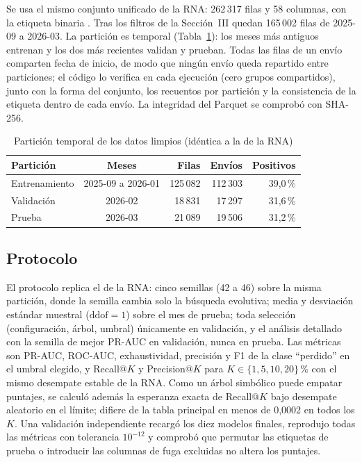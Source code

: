 \documentclass[conference]{IEEEtran}
\newcommand{\col}[1]{\texttt{\detokenize{#1}}}
\begin{document}
Se usa el mismo conjunto unificado de la RNA: 262\,317 filas y 58 columnas,
con la etiqueta binaria \col{is_lost}. Tras los filtros de la Sección~III
quedan 165\,002 filas de 2025-09 a 2026-03. La partición es temporal
(Tabla~\ref{tab:particion}): los meses más antiguos entrenan y los dos más
recientes validan y prueban. Todas las filas de un envío comparten fecha de
inicio, de modo que ningún envío queda repartido entre particiones; el código
lo verifica en cada ejecución (cero grupos compartidos), junto con la forma
del conjunto, los recuentos por partición y la consistencia de la etiqueta
dentro de cada envío. La integridad del Parquet se comprobó con SHA-256.

\begin{table}[htbp]
\caption{Partición temporal de los datos limpios (idéntica a la de la RNA)}
\label{tab:particion}
\centering
\footnotesize
\begin{tabular}{lcrrr}
\toprule
\textbf{Partición} & \textbf{Meses} & \textbf{Filas} & \textbf{Envíos} & \textbf{Positivos}\\
\midrule
Entrenamiento & 2025-09 a 2026-01 & 125\,082 & 112\,303 & 39,0\,\%\\
Validación & 2026-02 & 18\,831 & 17\,297 & 31,6\,\%\\
Prueba & 2026-03 & 21\,089 & 19\,506 & 31,2\,\%\\
\bottomrule
\end{tabular}
\end{table}

\subsection{Protocolo}

El protocolo replica el de la RNA: cinco semillas (42 a 46) sobre la misma
partición, donde la semilla cambia solo la búsqueda evolutiva; media y
desviación estándar muestral ($\mathrm{ddof}=1$) sobre el mes de prueba; toda
selección (configuración, árbol, umbral) únicamente en validación, y el
análisis detallado con la semilla de mejor PR-AUC en validación, nunca en
prueba. Las métricas son PR-AUC, ROC-AUC, exhaustividad, precisión y F1 de la
clase ``perdido'' en el umbral elegido, y Recall@$K$ y Precision@$K$ para
$K \in \{1, 5, 10, 20\}$\,\% con el mismo desempate estable de la RNA. Como un
árbol simbólico puede empatar puntajes, se calculó además la esperanza exacta
de Recall@$K$ bajo desempate aleatorio en el límite; difiere de la tabla
principal en menos de 0,0002 en todos los $K$. Una validación independiente
recargó los diez modelos finales, reprodujo todas las métricas con tolerancia
$10^{-12}$ y comprobó que permutar las etiquetas de prueba o introducir las
columnas de fuga excluidas no altera los puntajes.
\end{document}
